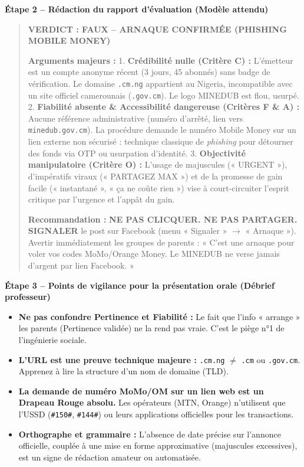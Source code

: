 \documentclass[11pt]{article}
\begin{document}
\begin{exoresolu}
\textbf{Étape 2 -- Rédaction du rapport d'évaluation (Modèle attendu)}

\begin{quote}
\textbf{VERDICT : FAUX -- ARNAQUE CONFIRMÉE (PHISHING MOBILE MONEY)}

\textbf{Arguments majeurs :}
1. \textbf{Crédibilité nulle (Critère C) :} L'émetteur est un compte anonyme récent (3 jours, 45 abonnés) sans badge de vérification. Le domaine \texttt{.cm.ng} appartient au Nigeria, incompatible avec un site officiel camerounais (\texttt{.gov.cm}). Le logo MINEDUB est flou, usurpé.
2. \textbf{Fiabilité absente \& Accessibilité dangereuse (Critères F \& A) :} Aucune référence administrative (numéro d'arrêté, lien vers \texttt{minedub.gov.cm}). La procédure demande le numéro Mobile Money sur un lien externe non sécurisé : technique classique de \emph{phishing} pour détourner des fonds via OTP ou usurpation d'identité.
3. \textbf{Objectivité manipulatoire (Critère O) :} L'usage de majuscules (« URGENT »), d'impératifs viraux (« PARTAGEZ MAX ») et de la promesse de gain facile (« instantané », « ça ne coûte rien ») vise à court-circuiter l'esprit critique par l'urgence et l'appât du gain.

\textbf{Recommandation :} \textbf{NE PAS CLICQUER. NE PAS PARTAGER. SIGNALER} le post sur Facebook (menu « Signaler » $\rightarrow$ « Arnaque »). Avertir immédiatement les groupes de parents : « C'est une arnaque pour voler vos codes MoMo/Orange Money. Le MINEDUB ne verse jamais d'argent par lien Facebook. »
\end{quote}

\textbf{Étape 3 -- Points de vigilance pour la présentation orale (Débrief professeur)}
\begin{itemize}
    \item \textbf{Ne pas confondre Pertinence et Fiabilité :} Le fait que l'info « arrange » les parents (Pertinence validée) ne la rend pas vraie. C'est le piège n°1 de l'ingénierie sociale.
    \item \textbf{L'URL est une preuve technique majeure :} \texttt{.cm.ng} $\neq$ \texttt{.cm} ou \texttt{.gov.cm}. Apprenez à lire la structure d'un nom de domaine (TLD).
    \item \textbf{La demande de numéro MoMo/OM sur un lien web est un \textbf{Drapeau Rouge} absolu.} Les opérateurs (MTN, Orange) n'utilisent que l'USSD (\texttt{\#150\#}, \texttt{\#144\#}) ou leurs applications officielles pour les transactions.
    \item \textbf{Orthographe et grammaire :} L'absence de date précise sur l'annonce officielle, couplée à une mise en forme approximative (majuscules excessives), est un signe de rédaction amateur ou automatisée.
\end{itemize}
\end{exoresolu}
\end{document}
